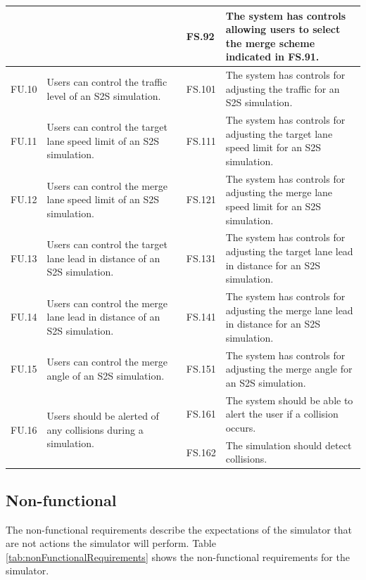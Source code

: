 \begin{longtable}{|p{0.1\linewidth}|p{0.4\linewidth}|p{0.1\linewidth}|p{0.4\linewidth}|}
 &  & FS.92 & The system has controls allowing users to select the merge scheme indicated in FS.91. \\ 
\hline
FU.10 & Users can control the traffic level of an S2S simulation. & FS.101 & The system has controls for adjusting the traffic for an S2S simulation. \\ 
\hline
FU.11 & Users can control the target lane speed limit of an S2S simulation. & FS.111 & The system has controls for adjusting the target lane speed limit for an S2S simulation. \\ 
\hline
FU.12 & Users can control the merge lane speed limit of an S2S simulation. & FS.121 & The system has controls for adjusting the merge lane speed limit for an S2S simulation. \\ 
\hline
FU.13 & Users can control the target lane lead in distance of an S2S simulation. & FS.131 & The system has controls for adjusting the target lane lead in distance for an S2S simulation. \\ 
\hline
FU.14 & Users can control the merge lane lead in distance of an S2S simulation. & FS.141 & The system has controls for adjusting the merge lane lead in distance for an S2S simulation. \\ 
\hline
FU.15 & Users can control the merge angle of an S2S simulation. & FS.151 & The system has controls for adjusting the merge angle for an S2S simulation. \\ 
\hline
\multirow{2}{*}{FU.16} & \multirow{2}{*}{\parbox{\linewidth}{Users should be alerted of any collisions during a simulation.}}
 & FS.161 & The system should be able to alert the user if a collision occurs. \\
 &  & FS.162 & The simulation should detect collisions. \\ 
\end{longtable}

\subsection{Non-functional}
\label{subsec:Non-functional}
The non-functional requirements describe the expectations of the simulator that are not actions the simulator will perform. Table \ref{tab:nonFunctionalRequirements} shows the non-functional requirements for the simulator.

